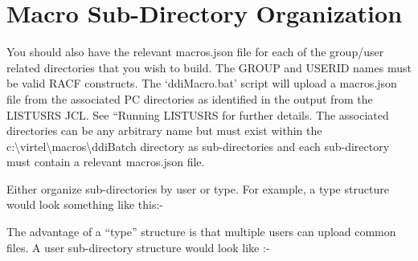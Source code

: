 \documentclass[letterpaper,10pt,english]{sphinxmanual}
\begin{document}
\section{Macro Sub-Directory Organization}
\label{\detokenize{TN201903:macro-sub-directory-organization}}
You should also have the relevant macros.json file for each of the group/user related directories that you wish to build. The GROUP and USERID names must be valid RACF constructs. The ‘ddiMacro.bat’ script will upload a macros.json file from the associated PC directories as identified in the output from the LISTUSRS JCL. See “Running LISTUSRS for further details. The associated directories can be any arbitrary name but must exist within the c:\textbackslash{}virtel\textbackslash{}macros\textbackslash{}ddiBatch directory as sub-directories and each sub-directory must contain a relevant macros.json file.

Either organize sub-directories by user or type. For example, a type structure would look something like this:-

\begin{sphinxVerbatim}[commandchars=\\\{\}]
\end{sphinxVerbatim}

The advantage of a “type” structure is that multiple users can upload common files. A user sub-directory structure would look like :-

\begin{sphinxVerbatim}[commandchars=\\\{\}]
\end{sphinxVerbatim}
\end{document}
